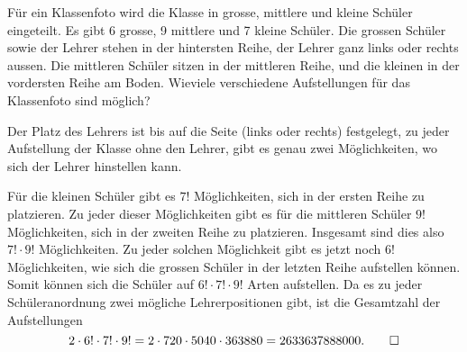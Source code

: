 Für ein Klassenfoto wird die Klasse in grosse, mittlere und kleine
Schüler eingeteilt. Es gibt 6 grosse, 9 mittlere und 7 kleine
Schüler. Die grossen Schüler sowie der Lehrer stehen in der
hintersten Reihe, der Lehrer ganz links oder rechts aussen. Die mittleren
Schüler sitzen in der mittleren Reihe, und die kleinen in der
vordersten Reihe am Boden. Wieviele verschiedene Aufstellungen für das
Klassenfoto sind möglich?


\begin{loesung}
Der Platz des Lehrers ist bis auf die Seite (links oder rechts)
festgelegt, zu jeder Aufstellung der Klasse ohne den Lehrer, gibt
es genau zwei Möglichkeiten, wo sich der Lehrer hinstellen kann.

Für die kleinen Schüler gibt es $7!$ Möglichkeiten, sich in
der ersten Reihe zu platzieren. Zu jeder dieser Möglichkeiten
gibt es für die mittleren Schüler $9!$ Möglichkeiten, sich in
der zweiten Reihe zu platzieren. Insgesamt sind dies also $7! \cdot 9!$
Möglichkeiten. Zu jeder solchen Möglichkeit gibt es jetzt noch $6!$
Möglichkeiten, wie sich die grossen Schüler in der letzten Reihe
aufstellen können. Somit können sich die Schüler auf $6!\cdot 7!\cdot 9!$
Arten aufstellen. Da es zu jeder Schüleranordnung zwei mögliche
Lehrerpositionen gibt, ist die Gesamtzahl der Aufstellungen
\[
2\cdot 6!\cdot 7!\cdot 9!=
2\cdot 720 \cdot 5040 \cdot 363880=2633637888000.
\qedhere
\]
\end{loesung}

